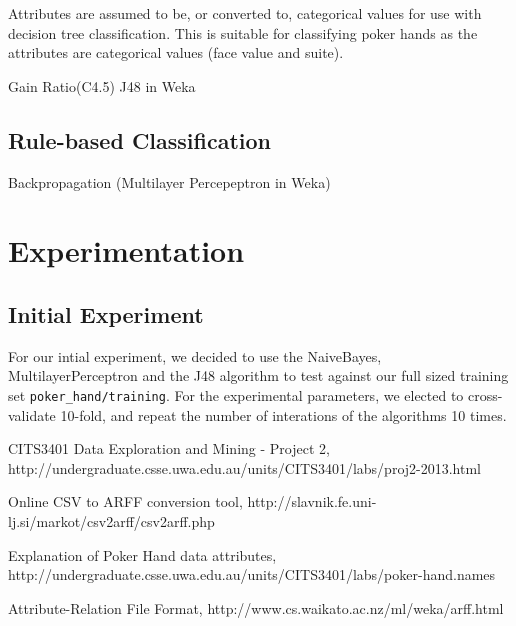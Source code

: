 \documentclass[11pt, a4paper]{article}
\begin{document}
Attributes are assumed to be, or converted to, categorical values for use with decision tree classification. This is suitable for classifying poker hands as the attributes are categorical values (face value and suite).

Gain Ratio(C4.5)
J48 in Weka


\subsection*{Rule-based Classification}

Backpropagation (Multilayer Percepeptron in Weka)

\section*{Experimentation}

\subsection*{Initial Experiment}

For our intial experiment, we decided to use the NaiveBayes, MultilayerPerceptron and the J48 algorithm to test against our full sized training set \texttt{poker\_hand/training}. For the experimental parameters, we elected to cross-validate 10-fold, and repeat the number of interations of the algorithms 10 times.

\begin{thebibliography}{9}

	CITS3401 Data Exploration and Mining - Project 2,
	http://undergraduate.csse.uwa.edu.au/units/CITS3401/labs/proj2-2013.html

	Online CSV to ARFF conversion tool,
	http://slavnik.fe.uni-lj.si/markot/csv2arff/csv2arff.php

	Explanation of Poker Hand data attributes,
	http://undergraduate.csse.uwa.edu.au/units/CITS3401/labs/poker-hand.names

	Attribute-Relation File Format,
	http://www.cs.waikato.ac.nz/ml/weka/arff.html

\end{thebibliography}


\end{document}
